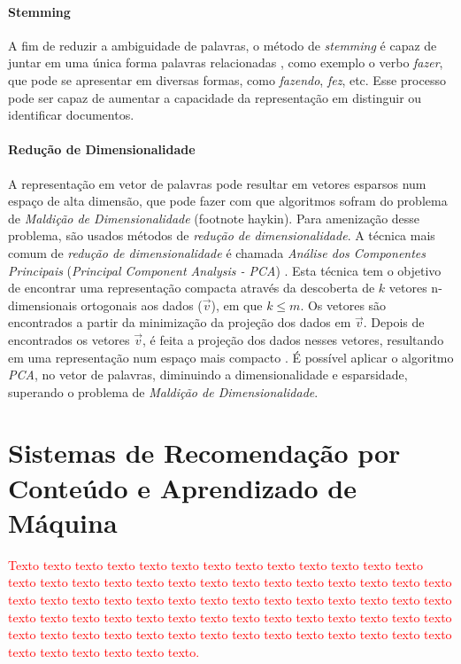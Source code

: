 \documentclass[normaltoc, espacoumemeio, pnumromarab,ruledheader]{abnt}
\begin{document}

	\subsubsection{Stemming}

	A fim de reduzir a ambiguidade de palavras, o método de \textit{stemming} é capaz de juntar em uma única forma palavras relacionadas \cite{Miner2012}, como exemplo o verbo \textit{fazer}, que pode se apresentar em diversas formas, como \textit{fazendo}, \textit{fez}, etc. Esse processo pode ser capaz de aumentar a capacidade da representação em distinguir ou identificar documentos.

	\subsubsection{Redução de Dimensionalidade}

	A representação em vetor de palavras pode resultar em vetores esparsos num espaço de alta dimensão, que pode fazer com que algoritmos sofram do problema de \textit{Maldição de Dimensionalidade} (footnote haykin).
	Para amenização desse problema, são usados métodos de \textit{redução de dimensionalidade}.
	A técnica mais comum de \textit{redução de dimensionalidade} é chamada \textit{Análise dos Componentes Principais} (\textit{Principal Component Analysis - PCA}) \cite{Murphy2012}.
	Esta técnica tem o objetivo de encontrar uma representação compacta através da descoberta de $k$ vetores n-dimensionais ortogonais aos dados ($\vec{v}$), em que $k \leq m$. Os vetores são encontrados a partir da minimização da projeção dos dados em $\vec{v}$.
	Depois de encontrados os vetores $\vec{v}$, é feita a projeção dos dados nesses vetores, resultando em uma representação num espaço mais compacto \cite{Kamber2011}.
	É possível aplicar o algoritmo \textit{PCA}, no vetor de palavras, diminuindo a dimensionalidade e esparsidade, superando o problema de \textit{Maldição de Dimensionalidade}.


\chapter{Sistemas de Recomendação por Conteúdo e Aprendizado de Máquina}

\textcolor{red}{Texto texto texto texto texto texto texto texto texto texto texto texto texto texto texto texto texto texto texto texto texto texto texto texto texto texto texto texto texto texto texto texto texto texto texto texto texto texto texto texto texto texto texto texto texto texto texto texto texto texto texto texto texto texto texto texto texto texto texto texto texto texto texto texto texto texto texto texto texto texto texto texto texto texto texto.}
\end{document}
